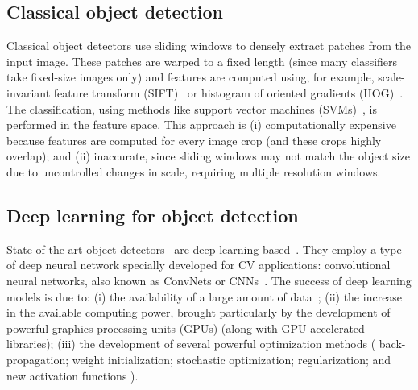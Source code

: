 \subsection{Classical object detection}

Classical object detectors use sliding windows to densely extract patches from the input image.
These patches are warped to a fixed length (since many classifiers take fixed-size images only) and features are computed using, for example, scale-invariant feature transform
(SIFT)~\cite{Lowe2004}
or
histogram of oriented gradients (HOG)~\cite{dalal2005}.
The classification, using methods like support vector machines (SVMs)~\cite{Boser1992},
is performed in the feature space.
This approach is (i) computationally expensive because features are computed for every image crop (and these crops highly overlap); and
(ii) inaccurate, since sliding windows may not match the object size due to uncontrolled changes in scale, requiring multiple resolution windows.

\subsection{Deep learning for object detection}

State-of-the-art object detectors~\cite{Sermanet2014, Redmon2016, Ren2017fasterpami} are deep-learning-based~\cite{goodfellow2016}.
They employ a type of deep neural network specially developed for CV applications: convolutional neural networks, also known as ConvNets or CNNs~\cite{LeCun1989}.
The success of deep learning models is due to: (i) the availability of a large amount of data~\cite{Krizhevsky2012, Russakovsky2015};
(ii) the increase in the available computing power, brought particularly by the development of powerful graphics processing units (GPUs) (along with GPU-accelerated libraries);
(iii) the development of several powerful optimization methods (\eg
back-propagation; %
weight initialization; %
stochastic optimization; %
regularization; and %
new activation functions%
).

